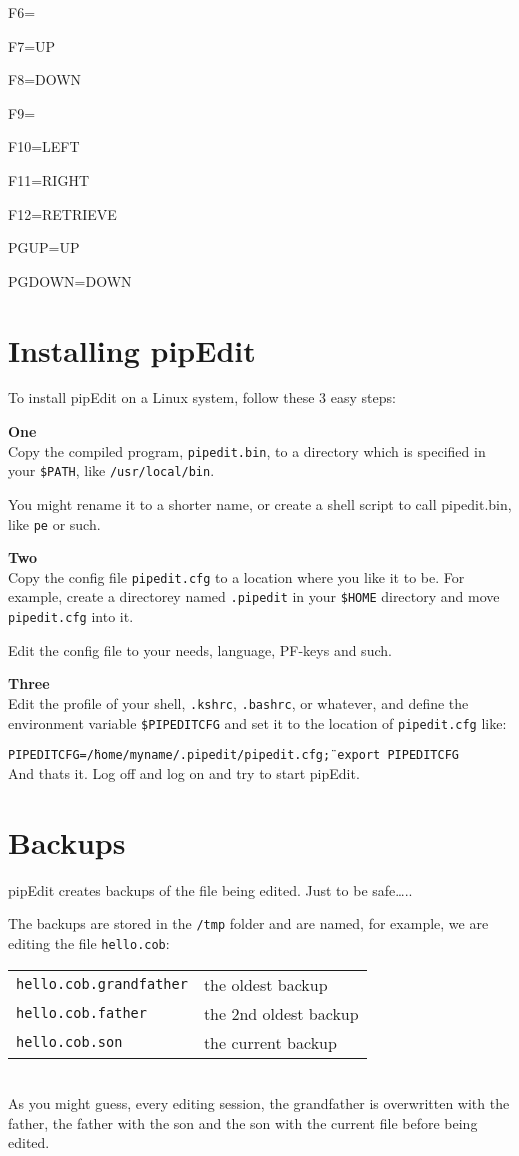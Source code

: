 \documentclass{report}
\begin{document}
F6=

F7=UP

F8=DOWN

F9=

F10=LEFT

F11=RIGHT

F12=RETRIEVE

PGUP=UP

PGDOWN=DOWN

\chapter{Installing pipEdit}
To install pipEdit on a Linux system, follow these 3 easy steps: \\
\break

\textbf{One} \\
Copy the compiled program, \texttt{pipedit.bin}, to a directory which is 
specified in your \texttt{\$PATH}, like \texttt{/usr/local/bin}.

You might rename it to a shorter name, or create a shell script to call pipedit.bin, like \texttt{pe} or such. \\
\break

\textbf{Two} \\
Copy the config file \texttt{pipedit.cfg} to a location where you like it to be.
For example, create a directorey named \texttt{.pipedit} in your 
\texttt{\$HOME} directory and move \texttt{pipedit.cfg} into it.

Edit the config file to your needs, language, PF-keys and such.
\\
\break

\textbf{Three} \\
Edit the profile of your shell, \texttt{.kshrc}, \texttt{.bashrc}, or whatever, 
and define
the environment variable \texttt{\$PIPEDITCFG} and set it to the location of
\texttt{pipedit.cfg} like:

\texttt{PIPEDITCFG=\"/home/myname/.pipedit/pipedit.cfg\" ; export PIPEDITCFG}
\\
\break
And thats it. Log off and log on and try to start pipEdit.

\chapter{Backups}

pipEdit creates backups of the file being edited. Just to be safe…..

The backups are stored in the \texttt{/tmp}
folder and are named, for example, we are editing the file 
\texttt{hello.cob}: \\
\break
\begin{tabular}{l l}
\texttt{hello.cob.grandfather}  & the oldest backup \\
\texttt{hello.cob.father} & the 2nd oldest backup \\
\texttt{hello.cob.son} & the current backup \\
\end{tabular} \\
\break
As you might guess, every editing session, the grandfather is overwritten with the father, the father with the son and the son with the current file before being edited.
\end{document}
